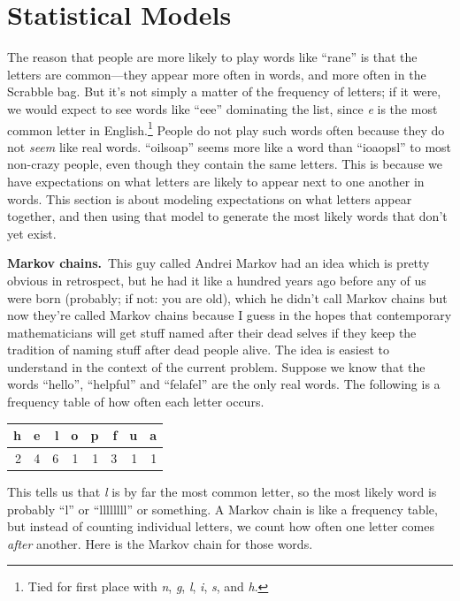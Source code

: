 \documentclass[twocolumn]{article}
\begin{document}
\section{Statistical Models}

The reason that people are more likely to play words like ``rane'' is
that the letters are common---they appear more often in words, and
more often in the Scrabble bag. But it's not simply a matter of the
frequency of letters; if it were, we would expect to see words like
``eee'' dominating the list, since {\it e} is the most common letter
in English.\!\footnote{Tied for first place with {\it n}, {\it g},
{\it l}, {\it i}, {\it s}, and {\it h}.} People do not play such words
often because they do not {\it seem} like real words. ``oilsoap''
seems more like a word than ``ioaopsl'' to most non-crazy people,
even though they contain the same letters. This is because we have
expectations on what letters are likely to appear next to one
another in words. This section is about modeling expectations on
what letters appear together, and then using that model to generate
the most likely words that don't yet exist.

{\bf Markov chains.}\,
This guy called Andrei Markov had an idea which is pretty obvious in
retrospect, but he had it like a hundred years ago before any of us
were born (probably; if not: you are old), which he didn't call Markov
chains but now they're called Markov chains because I guess in the
hopes that contemporary mathematicians will get stuff named after
their dead selves if they keep the tradition of naming stuff after
dead people alive. The idea is easiest to understand in the context
of the current problem. Suppose we know that the words ``hello'',
``helpful'' and ``felafel'' are the only real words. The following
is a frequency table of how often each letter occurs.

\vspace{0.2in}
\begin{centering}
\begin{tabular}{|r|r|r|r|r|r|r|r|} %
\hline
h   & e   & l   & o   & p   & f   & u   & a    \\
\hline
2   & 4   & 6   & 1   & 1   & 3   & 1   & 1    \\
\hline
\end{tabular}
\end{centering}
\vspace{0.2in}

This tells us that {\it l} is by far the most common letter, so the
most likely word is probably ``l'' or ``llllllll'' or something. A
Markov chain is like a frequency table, but instead of counting
individual letters, we count how often one letter comes {\it after}
another. Here is the Markov chain for those words.
\end{document}
